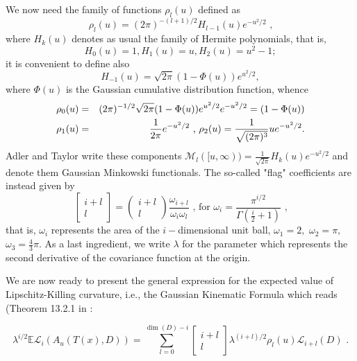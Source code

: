 \documentclass[aps,prd,showpacs,superscriptaddress,groupedaddress]{revtex4-1}  %
\begin{document}
We now need the family of functions $\rho _{l}(u)$ defined as
\begin{equation}
\rho _{l}(u)=(2\pi )^{-(l+1)/2}H_{l-1}(u)e^{-u^{2}/2}\text{ ,}
\end{equation} where $H_{k}(u)$ denotes as usual the family of Hermite polynomials, that is,
\begin{equation}
H_{0}(u)=1, H_{1}(u)=u, H_{2}(u)=u^{2}-1;
\end{equation}
it is convenient to define also
\begin{equation}
H_{-1}(u)=\sqrt{2\pi }(1-\Phi (u))e^{u^{2}/2},
\end{equation}
where $\Phi (u)$ is the Gaussian cumulative distribution function, whence%
\begin{eqnarray}
\rho _{0}(u) &=&(2\pi )^{-1/2}\sqrt{2\pi }(1-\Phi
(u))e^{u^{2}/2}e^{-u^{2}/2}=(1-\Phi (u)) \\
\rho _{1}(u) &=&\frac{1}{2\pi }e^{-u^{2}/2}\text{ , }\rho _{2}(u)=\frac{1}{%
\sqrt{(2\pi )^{3}}}ue^{-u^{2}/2}.
\end{eqnarray}%
Adler and Taylor \cite{TaylorAdler2009} write these components $\mathcal{M}_{l}([u,\infty ))=\frac{1}{\sqrt{2\pi }}%
H_{k}(u)e^{-u^{2}/2}$ and denote them Gaussian Minkowski functionals. The so-called "flag" coefficients are instead given by
\begin{equation}
\left[
\begin{array}{c}
i+l \\
l%
\end{array}%
\right] =\left(
\begin{array}{c}
i+l \\
l%
\end{array}%
\right) \frac{\omega _{i+l}}{\omega _{i}\omega _{l}}\text{ , for }\omega
_{i}=\frac{\pi ^{i/2}}{\Gamma (\frac{i}{2}+1)}\text{ ,}
\end{equation}%
that is, $\omega _{i}$ represents the area of the $i-$dimensional unit ball, $%
\omega _{1}=2,$ $\omega _{2}=\pi ,$ $\omega _{3}=\frac{4}{3}\pi.$
As a last ingredient, we write $\lambda$ for the parameter which represents the second derivative of
the covariance function at the origin.

We are now ready to present the general expression for the expected value of Lipschitz-Killing curvature, i.e., the Gaussian Kinematic Formula which reads (Theorem 13.2.1 in \cite{RFG}:

\begin{equation}
\lambda ^{i/2}\mathbb{E}\mathcal{L}_{i}(A_{u}(T(x),D))=\sum_{l=0}^{\dim
(D)-i}\left[
\begin{array}{c}
i+l \\
l%
\end{array}%
\right] \lambda ^{(i+l)/2}\rho _{l}(u)\mathcal{L}_{i+l}(D)\text{ .}
\label{GKF}
\end{equation}
\end{document}
